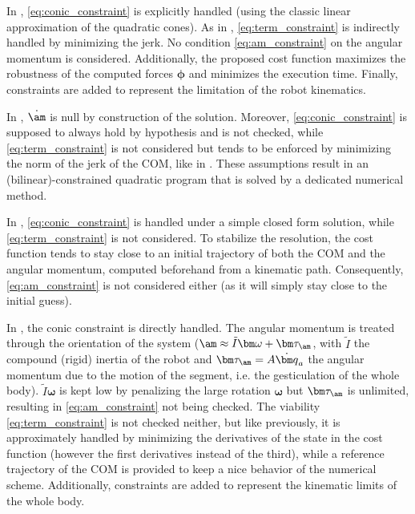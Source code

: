In \cite{qiu_dhm11}, \eqref{eq:conic_constraint} is explicitly handled (using the classic linear approximation of the quadratic cones). As in \cite{perrin_isrr15}, \eqref{eq:term_constraint} is indirectly handled by minimizing the jerk. No condition \eqref{eq:am_constraint} on the angular momentum is considered. Additionally, the proposed cost function maximizes the robustness of the computed forces $\bm\phi$ and minimizes the execution time. Finally, constraints are added to represent the limitation of the robot kinematics.

In \cite{perrin_isrr15}, $\dot \am$ is null by construction of the solution. Moreover, \eqref{eq:conic_constraint} is supposed to always hold by hypothesis and is not checked, while \eqref{eq:term_constraint} is not considered but tends to be enforced by minimizing the norm of the jerk of the COM, like in \cite{Kajita:icra:2003}. These assumptions result in an (bilinear)-constrained quadratic program that is solved by a dedicated numerical method.

In \cite{rotella_humanoid15}, \eqref{eq:conic_constraint} is handled under a simple closed form solution, while \eqref{eq:term_constraint} is not considered. To stabilize the resolution, the cost function tends to stay close to an initial trajectory of both the COM and the angular momentum, computed beforehand from a kinematic path. Consequently, \eqref{eq:am_constraint} is not considered either (as it will simply stay close to the initial guess).

In \cite{kudruss_ichr15}, the conic constraint is directly handled. The angular momentum is treated through the orientation of the system ($\am \approx \tilde I \bm \omega + \bm\tau_\am$, with  $\tilde I$ the compound (rigid) inertia of the robot and $\bm \tau_\am = A \dot{\bm q}_a$ the angular momentum due to the motion of the segment, i.e. the gesticulation of the whole body). $\tilde I \bm \omega$ is kept low by penalizing the large rotation $\bm \omega$ but $\bm \tau_\am$ is unlimited, resulting in \eqref{eq:am_constraint} not being checked. The viability \eqref{eq:term_constraint} is not checked neither, but like previously, it is approximately handled by minimizing the derivatives of the state in the cost function (however the first derivatives instead of the third), while a reference trajectory of the COM is provided to keep a nice behavior of the numerical scheme. Additionally, constraints are added to represent the kinematic limits of the whole body. 

